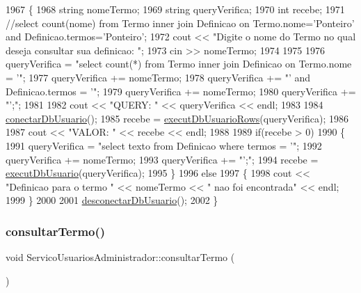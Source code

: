\begin{DoxyCode}
1967 \{
1968   \textcolor{keywordtype}{string} nomeTermo;
1969   \textcolor{keywordtype}{string} queryVerifica;
1970   \textcolor{keywordtype}{int} recebe;
1971 \textcolor{comment}{//select count(nome) from Termo inner join Definicao on Termo.nome='Ponteiro' and
       Definicao.termos='Ponteiro';}
1972   cout << \textcolor{stringliteral}{"Digite o nome do Termo no qual deseja consultar sua definicao: "};
1973   cin >> nomeTermo;
1974 
1975 
1976   queryVerifica = \textcolor{stringliteral}{"select count(*) from Termo inner join Definicao on Termo.nome = '"};
1977   queryVerifica += nomeTermo;
1978   queryVerifica += \textcolor{stringliteral}{"' and Definicao.termos = '"};
1979   queryVerifica += nomeTermo;
1980   queryVerifica += \textcolor{stringliteral}{"';"};
1981 
1982   cout << \textcolor{stringliteral}{"QUERY: "} <<  queryVerifica << endl;
1983 
1984   \mbox{\hyperlink{comando_sql_8cpp_a4f89ddcbc4cf8f2587d89f72f8c7900d}{conectarDbUsuario}}();
1985   recebe = \mbox{\hyperlink{comando_sql_8cpp_af54952694f2fa7d76f969fb74b853cb9}{executDbUsuarioRows}}(queryVerifica);
1986 
1987   cout << \textcolor{stringliteral}{"VALOR: "} << recebe << endl;
1988 
1989   \textcolor{keywordflow}{if}(recebe > 0)
1990   \{
1991     queryVerifica = \textcolor{stringliteral}{"select texto from Definicao where termos = '"};
1992     queryVerifica += nomeTermo;
1993     queryVerifica += \textcolor{stringliteral}{"';"};
1994     recebe = \mbox{\hyperlink{comando_sql_8cpp_a748197580e7f9acdbf48c78de1f7924b}{executDbUsuario}}(queryVerifica);
1995   \}
1996   \textcolor{keywordflow}{else}
1997   \{
1998     cout << \textcolor{stringliteral}{"Definicao para o termo "} << nomeTermo << \textcolor{stringliteral}{" nao foi encontrada"} << endl;
1999   \}
2000 
2001   \mbox{\hyperlink{comando_sql_8cpp_a969be9911913568e30d4ae8963338bc3}{desconectarDbUsuario}}();
2002 \}
\end{DoxyCode}
\mbox{\label{class_servico_usuarios_administrador_aec8b05b7c4a2fb318b6be8f6704d68eb}} 
\subsubsection{\texorpdfstring{consultar\+Termo()}{consultarTermo()}}
{\footnotesize\ttfamily void Servico\+Usuarios\+Administrador\+::consultar\+Termo (\begin{DoxyParamCaption}{ }\end{DoxyParamCaption})\hspace{0.3cm}{\ttfamily [virtual]}}



